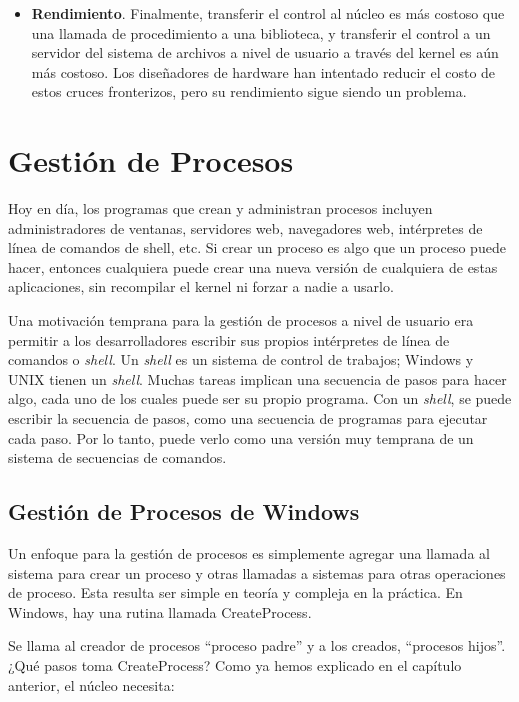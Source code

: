 \documentclass[10pt]{book}
\begin{document}
\begin{itemize}
\item \textbf{Rendimiento}. Finalmente, transferir el control al núcleo es más costoso que una llamada de procedimiento a una biblioteca, y transferir el control a un servidor del sistema de archivos a nivel de usuario a través del kernel es aún más costoso. Los diseñadores de hardware han intentado reducir el costo de estos cruces fronterizos, pero su rendimiento sigue siendo un problema.
\end{itemize}

\section{Gestión de Procesos}
Hoy en día, los programas que crean y administran procesos incluyen administradores de ventanas, servidores web, navegadores web, intérpretes de línea de comandos de shell, etc. Si crear un proceso es algo que un proceso puede hacer, entonces cualquiera puede crear una nueva versión de cualquiera de estas aplicaciones, sin recompilar el kernel ni forzar a nadie a usarlo.

Una motivación temprana para la gestión de procesos a nivel de usuario era permitir a los desarrolladores escribir sus propios intérpretes de línea de comandos o \textit{shell}. Un \textit{shell} es un sistema de control de trabajos; Windows y UNIX tienen un \textit{shell}. Muchas tareas implican una secuencia de pasos para hacer algo, cada uno de los cuales puede ser su propio programa. Con un \textit{shell}, se puede escribir la secuencia de pasos, como una secuencia de programas para ejecutar cada paso. Por lo tanto, puede verlo como una versión muy temprana de un sistema de secuencias de comandos.

\subsection{Gestión de Procesos de Windows}
Un enfoque para la gestión de procesos es simplemente agregar una llamada al sistema para crear un proceso y otras llamadas a sistemas para otras operaciones de proceso. Esta resulta ser simple en teoría y compleja en la práctica. En Windows, hay una rutina llamada {\mf CreateProcess}.

Se llama al creador de procesos ``proceso padre'' y a los creados, ``procesos hijos''. ¿Qué pasos toma {\mf CreateProcess}? Como ya hemos explicado en el capítulo anterior, el núcleo necesita:
\end{document}
